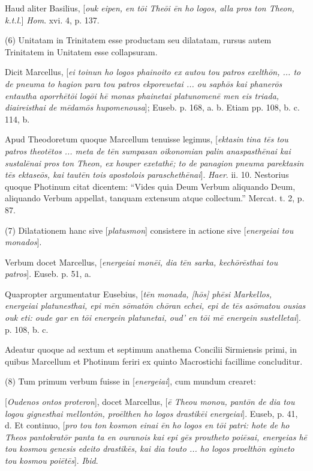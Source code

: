 Haud
aliter Basilius, [\emph{ouk eipen, en t\={o}i The\={o}i \={e}n
ho logos, alla pros ton Theon, k.t.l.}] \emph{Hom}. xvi. 4, p. 137.

(6)
Unitatam in Trinitatem esse productam seu dilatatam, rursus autem
Trinitatem in Unitatem esse collapsuram.

Dicit
Marcellus, [\emph{ei toinun ho logos phainoito ex autou tou patros exelth\={o}n,
... to de pneuma to hagion para tou patros ekporeuetai ... ou saph\={o}s
kai phaner\={o}s entautha aporrh\={e}t\={o}i log\={o}i h\={e}
monas phainetai platunomen\={e} men eis triada, diaireisthai de m\={e}dam\={o}s
hupomenousa}]; Euseb. p. 168, a. b. Etiam pp. 108, b. c. 114, b.

Apud
Theodoretum quoque Marcellum tenuisse legimus, [\emph{ektasin tina t\={e}s
tou patros theot\={e}tos ... meta de t\={e}n sumpasan oikonomian
palin anaspasth\={e}nai kai sustal\={e}nai pros ton Theon, ex
houper exetath\={e}; to de panagion pneuma parektasin t\={e}s
ektase\={o}s, kai taut\={e}n tois apostolois parascheth\={e}nai}].
\emph{Haer}. ii. 10. Nestorius quoque Photinum citat dicentem: ``Vides
quia Deum Verbum aliquando Deum, aliquando Verbum appellat, tanquam
extensum atque collectum.'' Mercat. t. 2, p. 87.

(7)
Dilatationem hanc sive [\emph{platusmon}] consistere in actione sive [\emph{energeiai
tou monados}].

Verbum
docet Marcellus, [\emph{energeiai mon\={e}i, dia t\={e}n sarka,
kech\={o}r\={e}sthai tou patros}]. Euseb. p. 51, a.

Quapropter
argumentatur Eusebius, [\emph{t\={e}n monada, [h\={o}s] ph\={e}si
Markellos, energeiai platunesthai, epi m\={e}n s\={o}mat\={o}n
ch\={o}ran echei, epi de t\={e}s as\={o}matou ousias ouk eti:
oude gar en t\={o}i energein platunetai, oud' en t\={o}i m\={e}
energein sustelletai}]. p. 108, b. c.

Adeatur
quoque ad sextum et septimum anathema Concilii Sirmiensis primi, in
quibus Marcellum et Photinum feriri ex quinto Macrostichi facillime
concluditur.

(8)
Tum primum verbum fuisse in [\emph{energeiai}], cum mundum crearet:

[\emph{Oudenos
ontos proteron}], docet Marcellus, [\emph{\={e} Theou monou, pant\={o}n
de dia tou logou gignesthai mellont\={o}n, pro\={e}lthen ho
logos drastik\={e}i energeiai}]. Euseb, p. 41, d. Et continuo, [\emph{pro
tou ton kosmon einai \={e}n ho logos en t\={o}i patri: hote de
ho Theos pantokrat\={o}r panta ta en ouranois kai epi g\={e}s
proutheto poi\={e}sai, energeias h\={e} tou kosmou genesis
edeito drastik\={e}s, kai dia touto ... ho logos proelth\={o}n
egineto tou kosmou poi\={e}t\={e}s}]. \emph{Ibid}.

